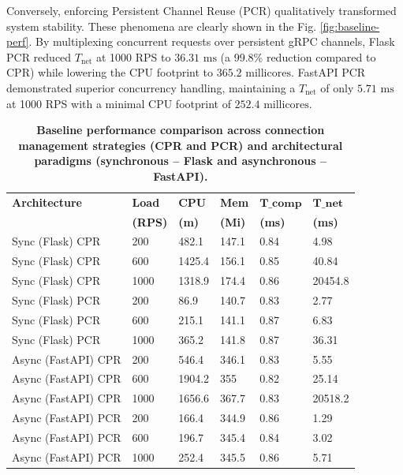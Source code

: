 \documentclass{ieeeaccess}
\begin{document}
	Conversely, enforcing Persistent Channel Reuse (PCR) qualitatively transformed system stability. These phenomena are clearly shown in the Fig. \ref{fig:baseline-perf}. By multiplexing concurrent requests over persistent gRPC channels, Flask PCR reduced $T_{\text{net}}$ at 1000 RPS to $36.31\text{ ms}$ (a 99.8\% reduction compared to CPR) while lowering the CPU footprint to $365.2\text{ millicores}$. FastAPI PCR demonstrated superior concurrency handling, maintaining a $T_{\text{net}}$ of only $5.71\text{ ms}$ at 1000 RPS with a minimal CPU footprint of $252.4\text{ millicores}$.
	
	\begin{table}[htbp]
		\centering
		\caption{\textbf{Baseline performance comparison across connection management strategies (CPR and PCR) and architectural paradigms (synchronous -- Flask and asynchronous -- FastAPI).}}
		\label{tab:baseline-comp}
		\setlength{\tabcolsep}{3pt}
		\begin{tabular}{llllll}
			\hline
			\textbf{Architecture}& \textbf{Load}& \textbf{CPU}& \textbf{Mem}& $\textbf{T_{comp}}$& $\textbf{T_{net}}$\\
			& \textbf{(RPS)}& \textbf{(m)}& \textbf{(Mi)}& \textbf{(ms)}& \textbf{(ms)}\\
			\hline
			Sync (Flask) CPR & 200  &  482.1 & 147.1 & 0.84 &    4.98 \\
			Sync (Flask) CPR & 600  & 1425.4 & 156.1 & 0.85 &   40.84 \\
			Sync (Flask) CPR & 1000 & 1318.9 & 174.4 & 0.86 & 20454.8 \\
			\hline
			Sync (Flask) PCR & 200  & 86.9  & 140.7 & 0.83 & 2.77 \\
			Sync (Flask) PCR & 600  & 215.1 & 141.1 & 0.87 & 6.83 \\
			Sync (Flask) PCR & 1000 & 365.2 & 141.8 & 0.87 & 36.31 \\
			\hline
			Async (FastAPI) CPR & 200  & 546.4  & 346.1 & 0.83 & 5.55 \\
			Async (FastAPI) CPR & 600  & 1904.2 & 355   & 0.82 & 25.14 \\
			Async (FastAPI) CPR & 1000 & 1656.6 & 367.7 & 0.83 & 20518.2 \\
			\hline
			Async (FastAPI) PCR & 200  & 166.4 & 344.9 & 0.86 & 1.29 \\
			Async (FastAPI) PCR & 600  & 196.7 & 345.4 & 0.84 & 3.02 \\
			Async (FastAPI) PCR & 1000 & 252.4 & 345.5 & 0.86 & 5.71 \\
			\hline
		\end{tabular}
	\end{table}
	
\end{document}
